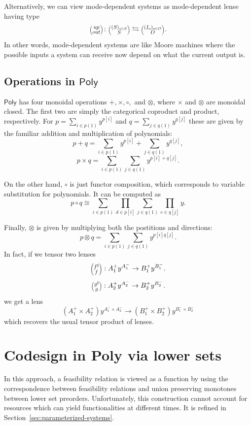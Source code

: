 \documentclass[12pt, a4paper]{article}
\theoremstyle{definition}
\theoremstyle{plain}
\theoremstyle{plain}
\theoremstyle{plain}
\theoremstyle{plain}
\theoremstyle{plain}
\theoremstyle{remark}
\theoremstyle{remark}
\newcommand{\lens}[2]{\scaleobj{0.6}{\begin{pmatrix} \scaleobj{1.3}{{#1}} \\ \scaleobj{1.3}{{#2}} \end{pmatrix}}}
\begin{document}
Alternatively, we can view mode-dependent systems as mode-dependent lense having type
$$ \lens{up}{out} \colon \lens{(S)_{s \in S}}{S} \leftrightarrows \lens{(I_o)_{o \in O}}{O}.$$
In other words, mode-dependent systems are like Moore machines where the possible inputs a system can receive now depend on what the current output is.

\subsection{Operations in $\mathsf{Poly}$}
$\mathsf{Poly}$ has four monoidal operations $+, \times,\circ,$ and $\otimes$, where $\times$ and $\otimes$ are monoidal closed. The first two are simply the categorical coproduct and product, respectively. For $p = \sum_{i \in p(1)} y^{p[i]}$ and $q = \sum_{j \in q(1)} y^{q[j]}$ these are given by the familiar addition and multiplication of polynomials:
$$p + q = \sum_{i \in p(1)} y^{p[i]} + \sum_{j \in q(1)} y^{q[j]},$$
$$p \times q = \sum_{i \in p(1)}\sum_{j \in q(1)} y^{p[i]+q[j]}.$$

On the other hand, $\circ$ is just functor composition, which corresponds to variable substitution for polynomials. It can be computed as
$$p \circ q \cong \sum_{i \in p(1)} \prod_{d \in p[i]} \sum_{j \in q(1)} \prod_{e \in q[j]} y .$$

Finally, $\otimes$ is given by multiplying both the postitions and directions:
$$p \otimes q = \sum_{i \in p(1)} \sum_{j \in q(1)} y^{p[i]q[j]}.$$
In fact, if we tensor two lenses 
$$\lens{f^\sharp}{f} :A^+_1 y^{A^-_1} \rightarrow B^+_1 y^{B^-_1} .$$
$$\lens{g^\sharp}{g} :A^+_2 y^{A^-_2} \rightarrow B^+_2 y^{B^-_2} .$$
we get a lens
$$(A^+_1 \times A^+_2)  y^{A^-_1 \times A^-_2} \rightarrow (B^+_1 \times B^+_2)y^{B^-_1 \times B^-_2}$$
which recovers the usual tensor product of lenses.

\section{Codesign in \textsf{Poly} via lower sets}
In this approach, a feasibility relation is viewed as a function by using the correspondence between feasibility relations and union preserving monotones between lower set preorders. Unfortunately, this construction cannot account for resources which can yield functionalities at different times. It is refined in Section~\ref{sec:parameterized-systems}.
\end{document}
